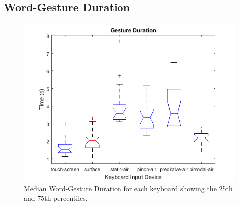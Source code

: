 \subsection{Word-Gesture Duration}
\begin{figure}[h]
	\centering
	\includegraphics{fig_time_boxplot}
	\caption[Word-Gesture Duration Boxplot]{Median Word-Gesture Duration for each keyboard showing the 25th and 75th percentiles.}
	\label{fig_time_boxplot}
\end{figure}

